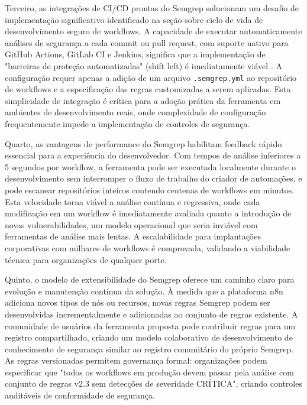 \documentclass{sftex}
\begin{document}
Terceiro, as integrações de CI/CD prontas do Semgrep solucionam um desafio de implementação significativo identificado na seção sobre ciclo de vida de desenvolvimento seguro de workflows. A capacidade de executar automaticamente análises de segurança a cada commit ou pull request, com suporte nativo para GitHub Actions, GitLab CI e Jenkins, significa que a implementação de "barreiras de proteção automatizadas" (shift left) é imediatamente viável \cite{gitlab_sast}. A configuração requer apenas a adição de um arquivo \texttt{.semgrep.yml} ao repositório de workflows e a especificação das regras customizadas a serem aplicadas. Esta simplicidade de integração é crítica para a adoção prática da ferramenta em ambientes de desenvolvimento reais, onde complexidade de configuração frequentemente impede a implementação de controles de segurança.

Quarto, as vantagens de performance do Semgrep habilitam feedback rápido essencial para a experiência do desenvolvedor. Com tempos de análise inferiores a 5 segundos por workflow, a ferramenta pode ser executada localmente durante o desenvolvimento sem interromper o fluxo de trabalho do criador de automações, e pode escanear repositórios inteiros contendo centenas de workflows em minutos. Esta velocidade torna viável a análise contínua e regressiva, onde cada modificação em um workflow é imediatamente avaliada quanto a introdução de novas vulnerabilidades, um modelo operacional que seria inviável com ferramentas de análise mais lentas. A escalabilidade para implantações corporativas com milhares de workflows é comprovada, validando a viabilidade técnica para organizações de qualquer porte.

Quinto, o modelo de extensibilidade do Semgrep oferece um caminho claro para evolução e manutenção contínua da solução. À medida que a plataforma n8n adiciona novos tipos de nós ou recursos, novas regras Semgrep podem ser desenvolvidas incrementalmente e adicionadas ao conjunto de regras existente. A comunidade de usuários da ferramenta proposta pode contribuir regras para um registro compartilhado, criando um modelo colaborativo de desenvolvimento de conhecimento de segurança similar ao registro comunitário do próprio Semgrep. As regras versionadas permitem governança formal: organizações podem especificar que "todos os workflows em produção devem passar pela análise com conjunto de regras v2.3 sem detecções de severidade CRÍTICA", criando controles auditáveis de conformidade de segurança.
\end{document}
